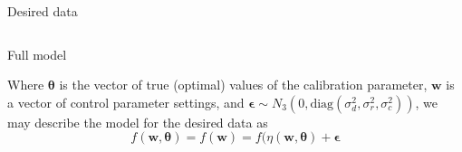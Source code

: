 \documentclass[final]{beamer}
\newlength{\onecolwid}
\newlength{\twocolwid}
\begin{document}
\begin{frame}[t]
\begin{columns}[t]
\begin{column}{\twocolwid}
\begin{columns}[t,totalwidth=\twocolwid]
\begin{column}{\onecolwid}
\begin{alertblock}{Desired data}
\end{alertblock}

\end{column} %

\end{columns} %



\begin{alertblock}{Full model}

Where $\boldsymbol \theta$ is the vector of true (optimal) values of the calibration parameter, $\mathbf w$ is a vector of control parameter settings, and $\boldsymbol \epsilon\sim N_3(0,\mathrm{diag}(\sigma^2_d,\sigma^2_r,\sigma^2_c))$, we may describe the model for the desired data as
\[
f(\mathbf w,\boldsymbol \theta) = f(\mathbf w) = f(\eta(\mathbf w,\boldsymbol \theta ) + \boldsymbol \epsilon
\]

\end{alertblock} 




\begin{columns}[t,totalwidth=\twocolwid] %

\begin{column}{\onecolwid} %



\end{column}
\end{columns}
\end{column}
\end{columns}
\end{frame}
\end{document}
